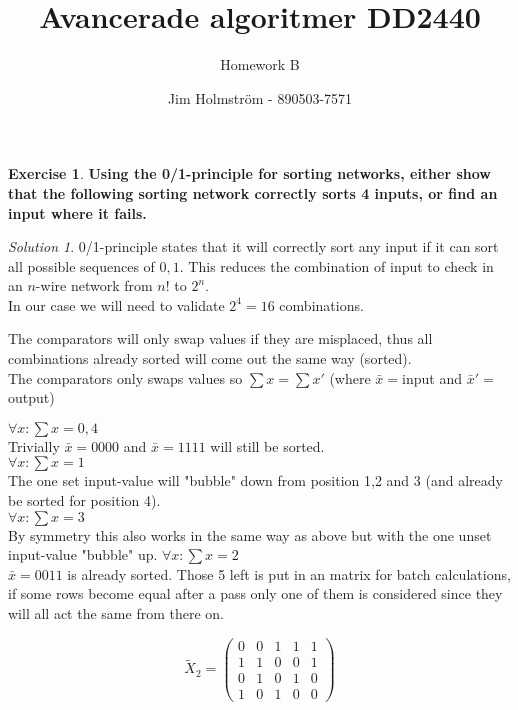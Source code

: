 \documentclass[a4paper,twoside=false,abstract=false,numbers=noenddot,
titlepage=false,headings=small,parskip=half,version=last]{scrartcl}
\author{Jim Holmström - 890503-7571}
\title{Avancerade algoritmer DD2440}
\subtitle{Homework B}
\theoremstyle{definition}
\newtheorem{exercise}{Exercise}
\theoremstyle{remark}
\newtheorem*{solution}{Solution}
\begin{document}
\maketitle
\thispagestyle{empty}

\begin{exercise}
{\bf %
Using the 0/1-principle for sorting networks, either show that the following
sorting network correctly sorts 4 inputs, or find an input where it fails.
}
\end{exercise}
\begin{solution}
0/1-principle states that it will correctly sort any input if it can sort all
possible sequences of ${0,1}$. This reduces the combination of input to check
in an $n$-wire network from $n!$ to $2^n$.\\
In our case we will need to validate $2^4=16$ combinations.

The comparators will only swap values if they are misplaced, thus all
combinations already sorted will come out the same way (sorted).\\

The comparators only swaps values so $\sum{x}=\sum{x'}$ (where $\bar{x}=$input
and $\bar{x}'=$output)

$\forall x : \sum{x}=0,4$\\
Trivially $\bar{x}=0000$ and $\bar{x}=1111$ will still be sorted.\\
$\forall x : \sum{x}=1$\\
The one set input-value will "bubble" down from position 1,2 and 3 (and already be
sorted for position 4).\\ 
$\forall x : \sum{x}=3$\\
By symmetry this also works in the same way as above but with the one unset input-value "bubble" up.
$\forall x : \sum{x}=2$\\
    $\bar{x}=0011$ is already sorted. Those 5 left is put in an matrix for
    batch calculations, if some rows become equal after a pass only one of them is
    considered since they will all act the same from there on.
    
    \begin{equation*}
        \tilde{X}_2= 
        \left(
        \begin{matrix}
            
                                     0 & 0 & 1 & 1 & 1 \\
                                     1 & 1 & 0 & 0 & 1 \\
                                     0 & 1 & 0 & 1 & 0 \\
                                     1 & 0 & 1 & 0 & 0
       \end{matrix}
       \right)
    \end{equation*}
    

\end{solution}
\end{document}

